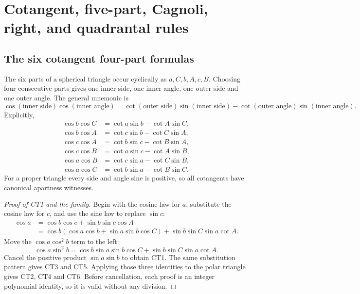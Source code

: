 \section{Cotangent, five-part, Cagnoli, right, and quadrantal rules}
\label{sec:cotangent-special}

\subsection{The six cotangent four-part formulas}

The six parts of a spherical triangle occur cyclically as
\(a,C,b,A,c,B\).  Choosing four consecutive parts gives one inner side, one
inner angle, one outer side and one outer angle.  The general mnemonic is
\begin{equation}
 \cos(\text{inner side})\cos(\text{inner angle})
 =\cot(\text{outer side})\sin(\text{inner side})
  -\cot(\text{outer angle})\sin(\text{inner angle}).        \tag{8.1}
\end{equation}
Explicitly,
\begin{align}
 \cos b\cos C&=\cot a\sin b-\cot A\sin C,                 \tag{CT1}\\
 \cos b\cos A&=\cot c\sin b-\cot C\sin A,                 \tag{CT2}\\
 \cos c\cos A&=\cot b\sin c-\cot B\sin A,                 \tag{CT3}\\
 \cos c\cos B&=\cot a\sin c-\cot A\sin B,                 \tag{CT4}\\
 \cos a\cos B&=\cot c\sin a-\cot C\sin B,                 \tag{CT5}\\
 \cos a\cos C&=\cot b\sin a-\cot B\sin C.                 \tag{CT6}
\end{align}
For a proper triangle every side and angle sine is positive, so all cotangents
have canonical apartness witnesses.

\begin{proof}[Proof of CT1 and the family]
Begin with the cosine law for \(a\), substitute the cosine law for \(c\), and
use the sine law to replace \(\sin c\):
\begin{align*}
 \cos a
 &=\cos b\cos c+\sin b\sin c\cos A\\
 &=\cos b(\cos a\cos b+\sin a\sin b\cos C)
   +\sin b\sin C\sin a\cot A.
\end{align*}
Move the \(\cos a\cos^2b\) term to the left:
\[
 \cos a\sin^2b
 =\cos b\sin a\sin b\cos C
  +\sin b\sin C\sin a\cot A.
\]
Cancel the positive product \(\sin a\sin b\) to obtain CT1.  The same
substitution pattern gives CT3 and CT5.  Applying those three identities to
the polar triangle gives CT2, CT4 and CT6.  Before cancellation, each proof is
an integer polynomial identity, so it is valid without any division.
\end{proof}

